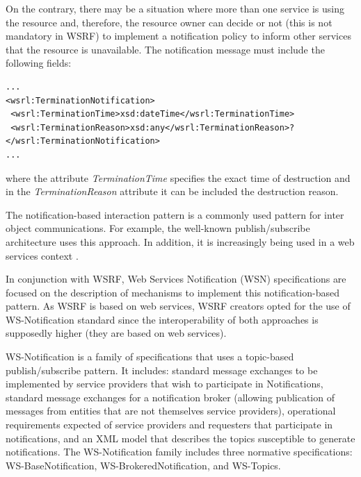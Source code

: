 On the contrary, there may be a situation where more than one service 
is using the resource and, therefore, the resource owner can decide or not 
(this is not mandatory in WSRF) to implement a notification policy
to inform other services that the resource is unavailable. The notification message must include the following fields: 
\newpage
{}
\begin{lstlisting}
...
<wsrl:TerminationNotification>
 <wsrl:TerminationTime>xsd:dateTime</wsrl:TerminationTime>
 <wsrl:TerminationReason>xsd:any</wsrl:TerminationReason>?
</wsrl:TerminationNotification>
...
\end{lstlisting}
where the attribute \emph{TerminationTime} specifies the exact time of destruction
and in the \emph{TerminationReason} attribute it can be included the destruction reason.

The notification-based interaction pattern is a commonly used pattern
for inter object communications. For example, the well-known
publish/subscribe architecture uses this approach. In addition, it is increasingly being
used in a web services context \cite{WSRFstandard}.

In conjunction with WSRF, Web Services Notification (WSN) specifications \cite{WSNstandard} are focused 
on the description of mechanisms to implement this notification-based pattern. 
As WSRF is based on web services, WSRF creators opted for the use
of WS-Notification standard since the interoperability of both approaches is supposedly higher (they
 are based on web services). 

WS-Notification is a family of specifications that uses a topic-based publish/subscribe
pattern. It includes: standard message exchanges to be implemented by service
providers that wish to participate in Notifications, standard message exchanges for a
notification broker (allowing publication of messages from entities that
are not themselves service providers), operational requirements expected of service providers 
and requesters that participate in notifications, and an XML model that
describes the topics susceptible to generate notifications. The WS-Notification family includes
three normative specifications:
WS-BaseNotification, WS-BrokeredNotification, and WS-Topics.

